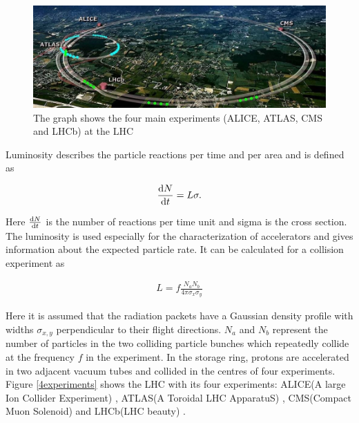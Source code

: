 \documentclass[12pt, a4paper]{thesis}
\begin{document}
\label{4experiments}
\begin{figure}[htbp]
\centering
\includegraphics[width=\textwidth]{../images/lhc.jpeg}
\caption{The graph shows the four main experiments (ALICE, ATLAS, CMS and LHCb) at the LHC \cite{lhcmap}}
\end{figure}



Luminosity describes the particle reactions per time and per area and is defined
as

\begin{align}
\dv{N}{t} = L \sigma.
\end{align}

Here \(\dv{N}{t}\) is the number of reactions per time unit and sigma is the cross
section.  The luminosity is used especially for the characterization of
accelerators and gives information about the expected particle rate. It can be
calculated for a collision experiment as

\begin{align}
L = f \frac{N_{a}N_{b}}{4 \pi \sigma_{x} \sigma_{y}}
\end{align}

Here it is assumed that the radiation packets have a Gaussian density
profile with widths \(\sigma_{x,y}\) perpendicular to their flight
directions.  \(N_{a}\) and \(N_{b}\) represent the number of particles in
the two colliding particle bunches which repeatedly collide at the
frequency \(f\) in the experiment.  In the storage ring, protons are
accelerated in two adjacent vacuum tubes and collided in the centres
of four experiments. Figure \ref{4experiments} shows the LHC with its
four experiments: ALICE(A large Ion Collider Experiment) \cite{alice},
ATLAS(A Toroidal LHC ApparatuS) \cite{atlas}, CMS(Compact Muon
Solenoid) \cite{cms} and LHCb(LHC beauty) \cite{lhcb}.
\end{document}
